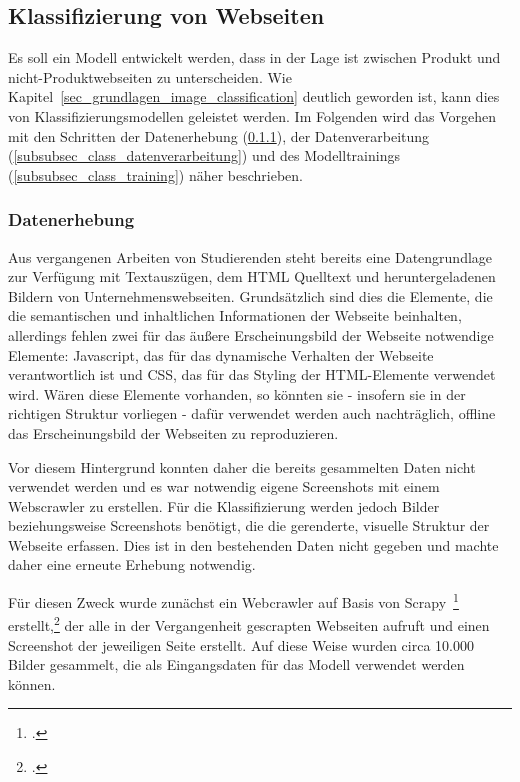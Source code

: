\subsection{Klassifizierung von Webseiten}\label{subsec_klassifierung_websites}
Es soll ein Modell entwickelt werden, dass in der Lage ist zwischen Produkt und nicht-Produktwebseiten zu unterscheiden.
Wie Kapitel~\ref{sec_grundlagen_image_classification} deutlich geworden ist, kann dies von Klassifizierungsmodellen geleistet werden.
Im Folgenden wird das Vorgehen mit den Schritten der Datenerhebung (\ref{subsubsec_class_datenerhebung}), der Datenverarbeitung (\ref{subsubsec_class_datenverarbeitung}) und des Modelltrainings (\ref{subsubsec_class_training}) näher beschrieben.

\subsubsection{Datenerhebung}\label{subsubsec_class_datenerhebung}
Aus vergangenen Arbeiten von Studierenden steht bereits eine Datengrundlage zur Verfügung mit Textauszügen, dem HTML Quelltext und heruntergeladenen Bildern von Unternehmenswebseiten.
Grundsätzlich sind dies die Elemente, die die semantischen und inhaltlichen Informationen der Webseite beinhalten, allerdings fehlen zwei für das äußere Erscheinungsbild der Webseite notwendige Elemente:
Javascript, das für das dynamische Verhalten der Webseite verantwortlich ist und CSS, das für das Styling der HTML-Elemente verwendet wird.
Wären diese Elemente vorhanden, so könnten sie - insofern sie in der richtigen Struktur vorliegen - dafür verwendet werden auch nachträglich, offline das Erscheinungsbild der Webseiten zu reproduzieren.

Vor diesem Hintergrund konnten daher die bereits gesammelten Daten nicht verwendet werden und es war notwendig eigene Screenshots mit einem Webscrawler zu erstellen.
Für die Klassifizierung werden jedoch Bilder beziehungsweise Screenshots benötigt, die die gerenderte, visuelle Struktur der Webseite erfassen.
Dies ist in den bestehenden Daten nicht gegeben und machte daher eine erneute Erhebung notwendig.

Für diesen Zweck wurde zunächst ein Webcrawler auf Basis von Scrapy~\footcite[\vglf][]{zotero-328} erstellt,\footcite[\vglf][]{ostkamp2022a} der alle in der Vergangenheit gescrapten Webseiten aufruft und einen Screenshot der jeweiligen Seite erstellt.
Auf diese Weise wurden circa 10.000 Bilder gesammelt, die als Eingangsdaten für das Modell verwendet werden können.

